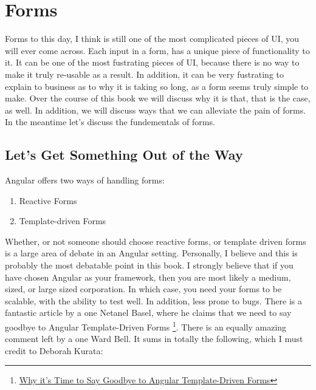 \maketitle{}
\section{ Forms }

Forms to this day, I think is still one of the most complicated pieces of UI,
you will ever come across. Each input in a form, has a unique piece of 
functionality to it. It can be one of the most fustrating pieces of UI, 
because there is no way to make it truly re-usable as a result. In 
addition, it can be very fustrating to explain to business as to why it is 
taking so long, as a form seems truly simple to make. Over the course of this 
book we will discuss why it is that, that is the case, as well. In addition,
we will discuss ways that we can alleviate the pain of forms. In the meantime 
let's discuss the fundementals of forms. 

\subsection{ Let's Get Something Out of the Way }

Angular offers two ways of handling forms: 
\begin{enumerate}
  \item Reactive Forms 
  \item Template-driven Forms
\end{enumerate}

Whether, or not someone should choose reactive forms, or template driven 
forms is a large area of debate in an Angular setting. Personally, I believe 
and this is probably the most debatable point in this book. I strongly 
believe that if you have chosen Angular as your framework, then you are most 
likely a medium, sized, or large sized corporation. In which case, you need 
your forms to be scalable, with the ability to test well. In addition, less 
prone to bugs. There is a fantastic article by a one Netanel Basel, where 
he claims that we need to say goodbye to Angular Template-Driven Forms
\footnote{\href{https://netbasal.com/why-its-time-to-say-goodbye-to-angular-template-driven-forms-350c11d004b}{Why it's Time to Say Goodbye to Angular Template-Driven Forms}}.
There is an equally amazing comment left by a one Ward Bell. It sums in totally the 
following, which I must credit to Deborah Kurata: 





